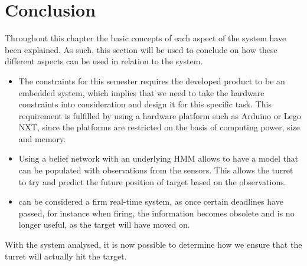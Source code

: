 \section{Conclusion}\label{EmbConc}

Throughout this chapter the basic concepts of each aspect of the system have
been explained. As such, this section will be used to conclude on how these
different aspects can be used in relation to the \name system.

\begin{itemize}
  \item The constraints for this semester requires the developed product to be
  an embedded system, which implies that we need to take the hardware
  constraints into consideration and design it for this specific task. This
  requirement is fulfilled by using a hardware platform such as Arduino or Lego
  NXT, since the platforms are restricted on the basis of computing power, size
  and memory.
  \item Using a belief network with an underlying HMM allows \name to have a
  model that can be populated with observations from the sensors. This allows
  the turret to try and predict the future position of target based on the
  observations.
  \item \name can be considered a firm real-time system, as once certain
  deadlines have passed, for instance when firing, the information becomes
  obsolete and is no longer useful, as the target will have moved on. 
\end{itemize}  

With the system analysed, it is now possible to determine how we ensure that
the turret will actually hit the target.


% 
